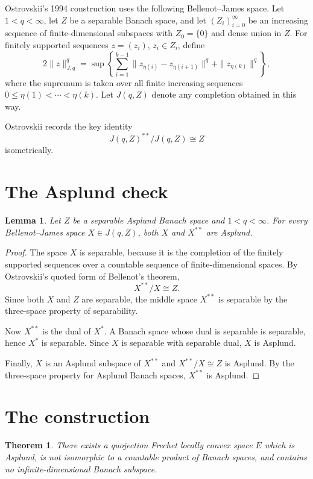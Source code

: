 \documentclass[11pt]{article}
\newtheorem{theorem}{Theorem}
\newtheorem{lemma}{Lemma}
\begin{document}
Ostrovskii's 1994 construction uses the following Bellenot--James space.  Let
\(1<q<\infty\), let \(Z\) be a separable Banach space, and let
\((Z_i)_{i=0}^\infty\) be an increasing sequence of finite-dimensional
subspaces with \(Z_0=\{0\}\) and dense union in \(Z\).  For finitely supported
sequences \(z=(z_i)\), \(z_i\in Z_i\), define
\[
2\|z\|_{J,q}^{q}
 =
\sup
\left\{
\sum_{i=1}^{k-1}\|z_{\eta(i)}-z_{\eta(i+1)}\|^{q}
 +
\|z_{\eta(k)}\|^{q}
\right\},
\]
where the supremum is taken over all finite increasing sequences
\(0\le \eta(1)<\cdots<\eta(k)\).  Let \(J(q,Z)\) denote any completion
obtained in this way.

Ostrovskii records the key identity
\[
J(q,Z)^{**}/J(q,Z)\cong Z
\]
isometrically.

\section*{The Asplund check}

\begin{lemma}
\label{lem:J-asplund}
Let \(Z\) be a separable Asplund Banach space and \(1<q<\infty\).  For every
Bellenot--James space \(X\in J(q,Z)\), both \(X\) and \(X^{**}\) are Asplund.
\end{lemma}

\begin{proof}
The space \(X\) is separable, because it is the completion of the finitely
supported sequences over a countable sequence of finite-dimensional spaces.
By Ostrovskii's quoted form of Bellenot's theorem,
\[
X^{**}/X \cong Z .
\]
Since both \(X\) and \(Z\) are separable, the middle space \(X^{**}\) is
separable by the three-space property of separability.

Now \(X^{**}\) is the dual of \(X^*\).  A Banach space whose dual is separable
is separable, hence \(X^*\) is separable.  Since \(X\) is separable with
separable dual, \(X\) is Asplund.

Finally, \(X\) is an Asplund subspace of \(X^{**}\) and
\(X^{**}/X\cong Z\) is Asplund.  By the three-space property for Asplund
Banach spaces, \(X^{**}\) is Asplund.
\end{proof}

\section*{The construction}

\begin{theorem}
\label{thm:main}
There exists a quojection Frechet locally convex space \(E\) which is Asplund,
is not isomorphic to a countable product of Banach spaces, and contains no
infinite-dimensional Banach subspace.
\end{theorem}
\end{document}
